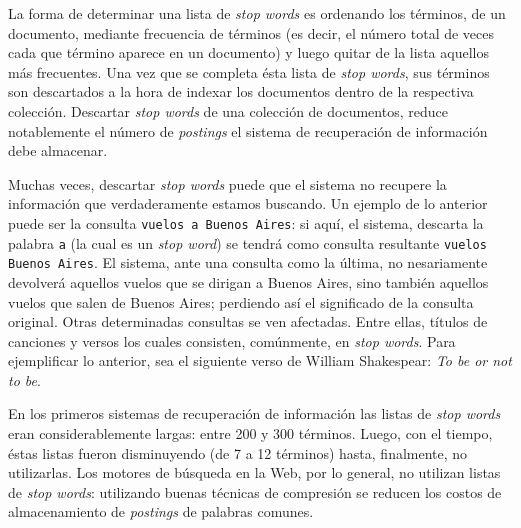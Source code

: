 		La forma de determinar una lista de \textit{stop words} es ordenando los términos, de un documento, mediante frecuencia de términos (es decir, el número total de veces cada que término aparece en un documento) y luego quitar de la lista aquellos más frecuentes. Una vez que se completa ésta lista de \textit{stop words}, sus términos son descartados a la hora de indexar los documentos dentro de la respectiva colección. Descartar \textit{stop words} de una colección de documentos, reduce notablemente el número de \textit{postings} el sistema de recuperación de información debe almacenar. \par
		
		Muchas veces, descartar \textit{stop words} puede que el sistema no recupere la información que verdaderamente estamos buscando. Un ejemplo de lo anterior puede ser la consulta \texttt{vuelos a Buenos Aires}: si aquí, el sistema, descarta la palabra \texttt{a} (la cual es un \textit{stop word}) se tendrá como consulta resultante \texttt{vuelos Buenos Aires}. El sistema, ante una consulta como la última, no nesariamente devolverá aquellos vuelos que se dirigan a Buenos Aires, sino también aquellos vuelos que salen de Buenos Aires; perdiendo así el significado de la consulta original. Otras determinadas consultas se ven afectadas. Entre ellas, títulos de canciones y versos los cuales consisten, comúnmente, en \textit{stop words}. Para ejemplificar lo anterior, sea el siguiente verso de William Shakespear: \textit{To be or not to be}. \par
		
		En los primeros sistemas de recuperación de información las listas de \textit{stop words} eran considerablemente largas: entre 200 y 300 términos. Luego, con el tiempo, éstas listas fueron disminuyendo (de 7 a 12 términos) hasta, finalmente, no utilizarlas. Los motores de búsqueda en la Web, por lo general, no utilizan listas de \textit{stop words}: utilizando buenas técnicas de compresión se reducen los costos de almacenamiento de \textit{postings} de palabras comunes.
		
